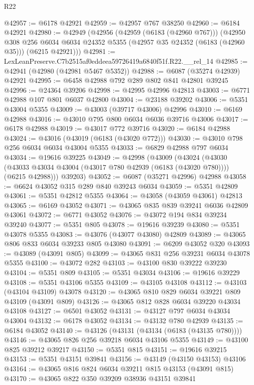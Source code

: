 \begin{lexlean}{R22}
\begin{coremodule}
@42957 := @6178 @42921
@42959 := @42957 @767 @38250
@42960 := @6184 @42921
@42980 := @42949
    (@42956
      (@42959 (@6183 (@42960 @767)))
      (@42950
        @308
        @256
        @6034
        @6034
        @24352
        @5355
        (@42957 @35 @24352 (@6183 (@42960 @35)))
        (@6215 @42921)))
@42981 := LexLeanPreserve.C7b2515af0eddeea59726419a6840f51f.R22.__rel_14
@42985 := @42941 (@42980 (@42981 @5467 @5352))
@42988 := @6087 (@35274 @42939) @42921
@42995 := @6458 @42988 @792 @289 @802 @841 @42801 @39245
@42996 := @24364 @39206
@42998 := @42995 @42996 @42813
@43003 := @6771 @42988 @107 @801 @6037 @42800
@43004 := @23188 @39202
@43006 := @5351 @43004 @5355
@43009 := @43003 (@39717 @43006) @42996
@43010 := @6169 @42988
@43016 := @43010 @795 @800 @6034 @6036 @39716 @43006
@43017 := @6178 @42988
@43019 := @43017 @772 @39716
@43020 := @6184 @42988
@43024 := @43016 (@43019 (@6183 (@43020 @772)))
@43030 := @43010 @798 @256 @6034 @6034 @43004 @5355
@43033 := @6829 @42988 @797 @6034
@43034 := @19616 @39225
@43049 := @42998
    (@43009
      (@43024
        (@43030 (@43033 @43034 @43004 (@43017 @780 @42939 (@6183 (@43020 @780)))) (@6215 @42988)))
      @39203)
@43052 := @6087 (@35271 @42996) @42988
@43058 := @6624 @43052 @315 @289 @840 @39243 @6034
@43059 := @5351 @42809
@43061 := @5351 @42812 @5355
@43064 := @43058 (@43059 @43061) @42813
@43065 := @6169 @43052
@43071 := @43065 @835 @839 @39241 @6036 @42809 @43061
@43072 := @6771 @43052
@43076 := @43072 @194 @834 @39234 @39240
@43077 := @5351 @805
@43078 := @19616 @39239
@43080 := @5351 @43078 @5355
@43083 := @43076 (@43077 @43080) @42809
@43089 := @43065 @806 @833 @6034 @39233 @805 @43080
@43091 := @6209 @43052 @320
@43093 := @43089 (@43091 @805)
@43099 := @43065 @831 @256 @39231 @6034 @43078 @5355
@43100 := @43072 @282
@43103 := @43100 @830 @39222 @39230
@43104 := @5351 @809
@43105 := @5351 @43034
@43106 := @19616 @39229
@43108 := @5351 @43106 @5355
@43109 := @43105 @43108
@43112 := @43103 (@43104 @43109) @43078
@43120 := @43065 @810 @829 @6034 @39221 @809 @43109 (@43091 @809)
@43126 := @43065 @812 @828 @6034 @39220 @43034 @43108
@43127 := @6501 @43052
@43131 := @43127 @797 @6034 @43034 @43004
@43132 := @6178 @43052
@43134 := @43132 @780 @42939
@43135 := @6184 @43052
@43140 := @43126 (@43131 (@43134 (@6183 (@43135 @780))))
@43146 := @43065 @826 @256 @39218 @6034 @43106 @5355
@43149 := @43100 @825 @39212 @39217
@43150 := @5351 @815
@43151 := @19616 @39215
@43153 := @5351 @43151 @39841
@43156 := @43149 (@43150 @43153) @43106
@43164 := @43065 @816 @824 @6034 @39211 @815 @43153 (@43091 @815)
@43170 := @43065 @822 @350 @39209 @38936 @43151 @39841

\end{coremodule}
\end{lexlean}
